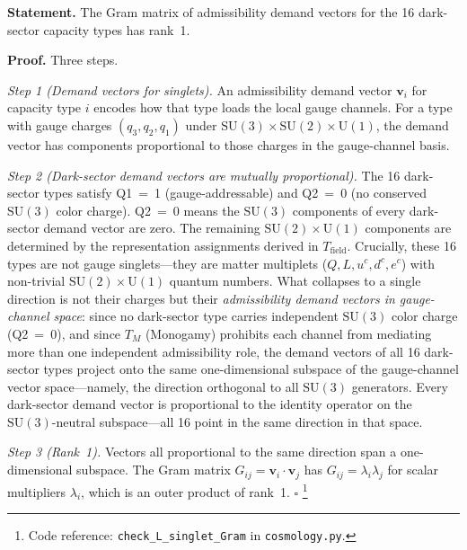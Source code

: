 \documentclass[11pt]{article}
\newcommand{\coderef}[2]{\footnote{Code reference: \texttt{#1} in \texttt{#2}.}}
\newcommand{\SU}{\mathrm{SU}}
\newcommand{\U}{\mathrm{U}}
\begin{document}
\begin{tcolorbox}[apfbox, title={Lemma $L_{\mathrm{singlet,Gram}}$ (Rank-1 Dark Sector)}]
\textbf{Statement.}  The Gram matrix of admissibility demand vectors for the 16 dark-sector capacity types has rank~1.

\smallskip\noindent\textbf{Proof.}  Three steps.

\textit{Step 1 (Demand vectors for singlets).}  An admissibility demand vector $\mathbf{v}_i$ for capacity type $i$ encodes how that type loads the local gauge channels.  For a type with gauge charges $(q_3, q_2, q_1)$ under $\SU(3) \times \SU(2) \times \U(1)$, the demand vector has components proportional to those charges in the gauge-channel basis.

\textit{Step 2 (Dark-sector demand vectors are mutually proportional).}  The 16 dark-sector types satisfy Q1~=~1 (gauge-addressable) and Q2~=~0 (no conserved $\SU(3)$ color charge).  Q2~=~0 means the $\SU(3)$ components of every dark-sector demand vector are zero.  The remaining $\SU(2) \times \U(1)$ components are determined by the representation assignments derived in $T_{\mathrm{field}}$.  Crucially, these 16 types are not gauge singlets---they are matter multiplets ($Q, L, u^c, d^c, e^c$) with non-trivial $\SU(2) \times \U(1)$ quantum numbers.  What collapses to a single direction is not their charges but their \emph{admissibility demand vectors in gauge-channel space}: since no dark-sector type carries independent $\SU(3)$ color charge (Q2~=~0), and since $T_M$ (Monogamy) prohibits each channel from mediating more than one independent admissibility role, the demand vectors of all 16 dark-sector types project onto the same one-dimensional subspace of the gauge-channel vector space---namely, the direction orthogonal to all $\SU(3)$ generators.  Every dark-sector demand vector is proportional to the identity operator on the $\SU(3)$-neutral subspace---all 16 point in the same direction in that space.

\textit{Step 3 (Rank~1).}  Vectors all proportional to the same direction span a one-dimensional subspace.  The Gram matrix $G_{ij} = \mathbf{v}_i \cdot \mathbf{v}_j$ has $G_{ij} = \lambda_i \lambda_j$ for scalar multipliers $\lambda_i$, which is an outer product of rank~1.  $\square$
\coderef{check\_L\_singlet\_Gram}{cosmology.py}
\end{tcolorbox}
\end{document}
